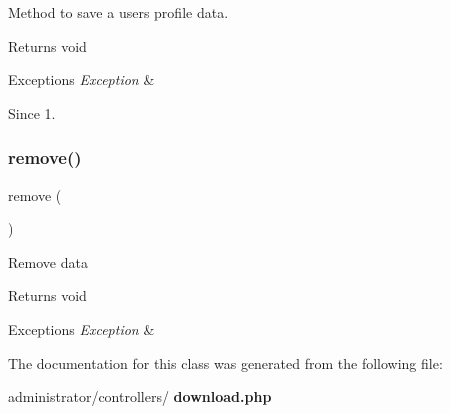 Method to save a user\textquotesingle{}s profile data.

\begin{DoxyReturn}{Returns}
void
\end{DoxyReturn}

\begin{DoxyExceptions}{Exceptions}
{\em Exception} & \\
\hline
\end{DoxyExceptions}
\begin{DoxySince}{Since}
1. 
\end{DoxySince}
\mbox{\label{classtks__agenda_controller_download_aff9a1fb07dca963c2c9a8ffe66b45ded}} 
\subsubsection{remove()}
{\footnotesize\ttfamily remove (\begin{DoxyParamCaption}{ }\end{DoxyParamCaption})}

Remove data

\begin{DoxyReturn}{Returns}
void
\end{DoxyReturn}

\begin{DoxyExceptions}{Exceptions}
{\em Exception} & \\
\hline
\end{DoxyExceptions}


The documentation for this class was generated from the following file\+:\begin{DoxyCompactItemize}
\item 
administrator/controllers/\textbf{ download.\+php}\end{DoxyCompactItemize}
